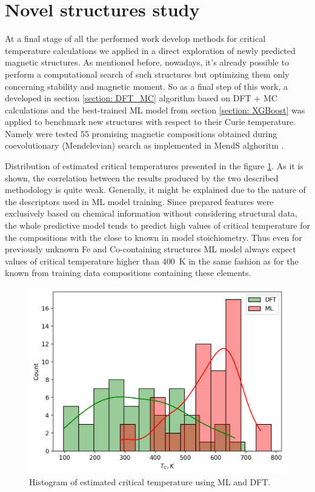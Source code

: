 \section{Novel structures study}

At a final stage of all the performed work develop methods for critical temperature calculations we applied in a direct exploration of newly predicted magnetic structures. As mentioned before, nowadays, it's already possible to perform a computational search of such structures but optimizing them only concerning stability and magnetic moment. So as a final step of this work, a developed in section \ref{section: DFT_MC} algorithm based on DFT + MC calculations and the best-trained ML model from section \ref{section: XGBoost} was applied to benchmark new structures with respect to their Curie temperature.  Namely were tested 55 promising magnetic compositions obtained during coevolutionary (Mendelevian) search as implemented in MendS alghoritm \cite{Allahyari_2020}.


Distribution of estimated critical temperatures presented in the figure \ref{fig:dft_hist}. As it is shown, the correlation between the results produced by the two described methodology is quite weak. Generally, it might be explained due to the nature of the descriptors used in ML model training. Since prepared features were exclusively based on chemical information without considering structural data, the whole predictive model tends to predict high values of critical temperature for the compositions with the close to known in model stoichiometry. Thus even for previously unknown Fe and Co-containing structures ML model always expect values of critical temperature higher than 400~K in the same fashion as for the known from training data compositions containing these elements.


\begin{figure}[H]
	\centering
	\includegraphics[width=120mm]{fig/dft_fig/ml_dft_hist.png}
	\caption[Histogram of estimated critical temperature using ML and DFT.]{Histogram of estimated critical temperature using ML and DFT.}
\label{fig:dft_hist}
\end{figure}


